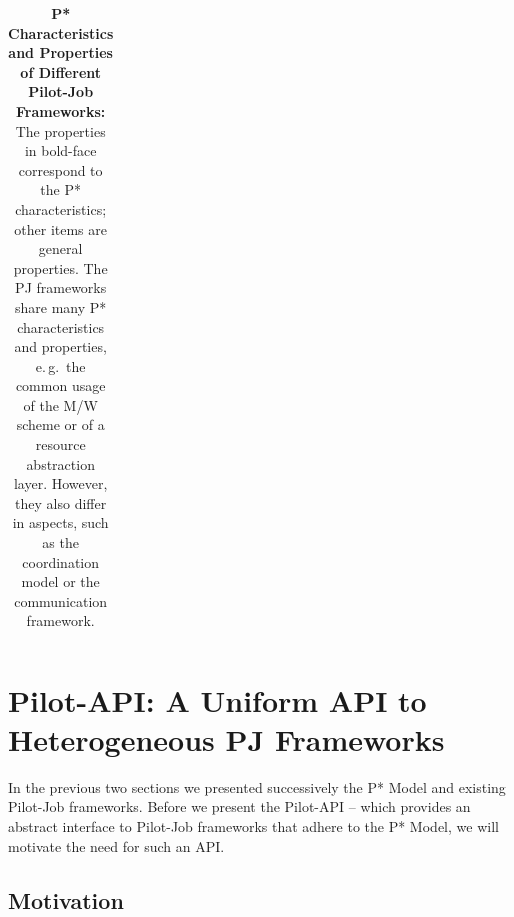 \documentclass[conference]{IEEEtran}
\begin{document}
\begin{table}[t]
\begin{tabular}{|p{1.9cm}|p{1.7cm}|p{1.6cm}|p{1.6cm}|}
	
\end{tabular}
\caption{\textbf{P* Characteristics and Properties of Different Pilot-Job 
Frameworks:} The properties
in bold-face correspond to the P* characteristics; other items are general 
properties. The PJ frameworks share many P* characteristics and 
properties, e.\,g.\ the common usage of the M/W scheme or of a 
resource abstraction layer. However, they also differ in aspects, such as  
the coordination model or the communication framework. \upp
}
\label{table:pilot-job-comparison}
\end{table}

%
%


\section{Pilot-API: A Uniform API to Heterogeneous PJ Frameworks}
\label{sec:pilot-api}




In the previous two sections we presented successively the P* Model
and existing Pilot-Job frameworks. Before we present the Pilot-API --
which provides an abstract interface to Pilot-Job frameworks that
adhere to the P* Model, we will motivate the need for such an API.

\subsection{Motivation} 

\end{document}
